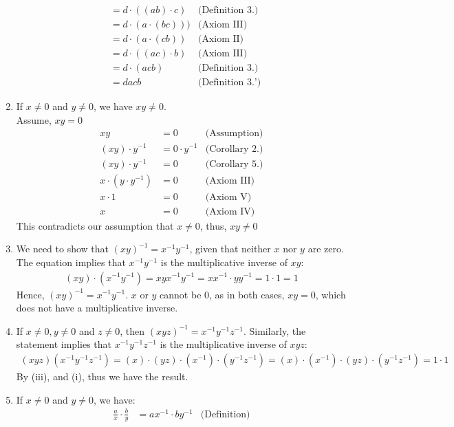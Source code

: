 \documentclass[12pt]{book}
\theoremstyle{definition}
\begin{document}
\begin{sol}
\begin{enumerate}[label=(\roman*)]
\begin{align*}
			&= d\cdot ((ab)\cdot c) &\text{(Definition 3.)}\\
			&= d\cdot (a\cdot (bc))) & \text{(Axiom III)}\\
			&= d \cdot (a\cdot (cb)) & \text{(Axiom II)}\\
			&= d\cdot ((ac)\cdot b) & \text{(Axiom III)}\\
			&= d \cdot (acb) & \text{(Definition 3.)}\\
			&= dacb & \text{(Definition 3.')}
		\end{align*}
 	\item If $x\neq 0$ and $y \neq 0$, we have $xy \neq 0$.\\
 		Assume, $xy=0$  
 		\begin{align*}
 			xy&=0 & \text{(Assumption)}\\
 			(xy)\cdot y^{-1} &= 0\cdot y^{-1} & \text{(Corollary 2.)}\\
 			(xy) \cdot y^{-1} &= 0 & \text{(Corollary 5.)}\\
 			x\cdot (y\cdot y^{-1}) &=0 &\text{(Axiom III)}\\
 			x\cdot 1&=0 & \text{(Axiom V)}\\
 			x&=0 & \text{(Axiom IV)} 
 		\end{align*}
		This contradicts our assumption that $x\neq 0$, thus, $xy\neq 0$
	\item We need to show that $(xy)^{-1}=x^{-1}y^{-1}$, given that neither $x$ nor $y$ are zero. The equation implies that $x^{-1}y^{-1}$ is the multiplicative inverse of $xy$:
		\begin{align*}
		(xy)\cdot (x^{-1}y^{-1})= xyx^{-1}y^{-1} = xx^{-1}\cdot yy^{-1} =1\cdot 1=1	
		\end{align*}
 		Hence, $(xy)^{-1} =x^{-1}y^{-1}$. $x$ or $y$ cannot be $0$, as in both cases, $xy=0$, which does not have a multiplicative inverse.
 	\item If $x\neq 0, y \neq 0$ and $z \neq 0$, then $(xyz)^{-1}=x^{-1}y^{-1}z^{-1}$. Similarly, the statement implies that $x^{-1}y^{-1}z^{-1}$ is the multiplicative inverse of $xyz$:
 		\begin{align*}
 			(xyz)(x^{-1}y^{-1}z^{-1}) = (x)\cdot (yz)\cdot(x^{-1}) \cdot (y^{-1}z^{-1})=(x) \cdot (x^{-1}) \cdot (yz)\cdot (y^{-1}z^{-1}) = 1 \cdot 1
 		\end{align*}
 		By (iii), and (i), thus we have the result.
 	\item If $x \neq 0$ and $y \neq 0$, we have:
 		\begin{align*}
 			\frac{a}{x}\cdot \frac{b}{y} &=ax^{-1} \cdot by^{-1} & \text{(Definition)}\\

\end{align*}
\end{enumerate}
\end{sol}
\end{document}
